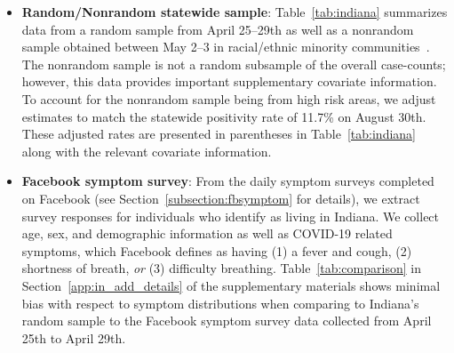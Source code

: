 \documentclass[11pt]{amsart}
\numberwithin{equation}{section}
\theoremstyle{plain}
\begin{document}
\begin{itemize}[leftmargin=*]
 \item {\bf Random/Nonrandom statewide sample}: Table~\ref{tab:indiana} summarizes data from a random sample from April 25--29th as well as a nonrandom sample obtained between May 2--3 in racial/ethnic minority communities~\citep{Yiannoutsos2021}. The nonrandom sample is not a random subsample of the overall case-counts; however, this data provides important supplementary covariate information.
 To account for the nonrandom sample being from high risk areas, we adjust estimates to match the statewide positivity rate of 11.7\% on August 30th. These adjusted rates are presented in parentheses in Table~\ref{tab:indiana} along with the relevant covariate information.

 \item {\bf Facebook symptom survey}: From the daily symptom surveys completed on Facebook (see Section~\ref{subsection:fbsymptom} for details), we extract survey responses for individuals who identify as living in Indiana.  We collect age, sex, and demographic information as well as COVID-19 related symptoms, which Facebook defines as having (1) a fever and cough, (2) shortness of breath, \emph{or} (3) difficulty breathing. Table~\ref{tab:comparison} in Section~\ref{app:in_add_details} of the supplementary materials shows minimal bias with respect to symptom distributions when comparing to Indiana's random sample to the Facebook symptom survey data collected from April 25th to April 29th.




\end{itemize}
\end{document}
